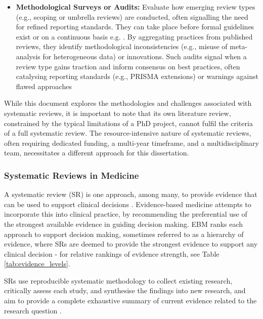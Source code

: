 \documentclass[10pt, english]{article}
\begin{document}
\begin{itemize}
    \item {\bf{Methodological Surveys or Audits:}}  Evaluate how emerging review types (e.g., scoping or umbrella reviews) are conducted, often signalling the need for refined reporting standards. They can take place before formal guidelines exist or on a continuous basis e.g. \cite{dalton_potential_2017, france_methodological_2014}. By aggregating practices from published reviews, they identify methodological inconsistencies (e.g., misuse of meta-analysis for heterogeneous data) or innovations. Such audits signal when a review type gains traction and inform consensus on best practices, often catalysing reporting standards (e.g., PRISMA extensions) or warnings against flawed approaches \cite{tricco_prisma_2018, sarkis-onofre_how_2021,rethlefsen_prisma-s_2021, rethlefsen_prisma-s_2021-1}
\end{itemize}

While this document explores the methodologies and challenges associated with systematic reviews, it is important to note that its own literature review, constrained by the typical limitations of a PhD project, cannot fulfil the criteria of a full systematic review. The resource-intensive nature of systematic reviews, often requiring dedicated funding, a multi-year timeframe, and a multidisciplinary team, necessitates a different approach for this dissertation.

\subsubsection{Systematic Reviews in Medicine}



A systematic review (SR) is one approach, among many, to provide evidence that can be used to support clinical decisions \cite{kranke_evidence-based_2010}. Evidence-based medicine attempts to incorporate this into clinical practice, by recommending the preferential use of the strongest available evidence in guiding decision making. EBM ranks each approach to support decision making, sometimes referred to as a hierarchy of evidence, where SRs are deemed to provide the strongest evidence to support any clinical decision - for relative rankings of evidence strength, see Table \ref{tab:evidence_levels}.



SRs use reproducible systematic methodology to collect existing research, critically assess each study, and synthesise the findings into new research, and aim to provide a complete exhaustive summary of current evidence related to the research question \cite{noauthor_cochrane_nodate}. 
\end{document}
